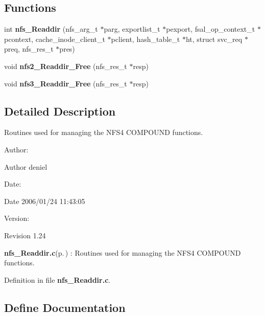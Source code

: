 \subsection*{Functions}
\begin{CompactItemize}
\item 
int {\bf nfs\_\-Readdir} (nfs\_\-arg\_\-t $\ast$parg, exportlist\_\-t $\ast$pexport, fsal\_\-op\_\-context\_\-t $\ast$pcontext, cache\_\-inode\_\-client\_\-t $\ast$pclient, hash\_\-table\_\-t $\ast$ht, struct svc\_\-req $\ast$preq, nfs\_\-res\_\-t $\ast$pres)
\item 
void {\bf nfs2\_\-Readdir\_\-Free} (nfs\_\-res\_\-t $\ast$resp)
\item 
void {\bf nfs3\_\-Readdir\_\-Free} (nfs\_\-res\_\-t $\ast$resp)
\end{CompactItemize}


\subsection{Detailed Description}
Routines used for managing the NFS4 COMPOUND functions. 

\begin{Desc}
\item[Author:]\begin{Desc}
\item[Author]deniel \end{Desc}
\end{Desc}
\begin{Desc}
\item[Date:]\begin{Desc}
\item[Date]2006/01/24 11:43:05 \end{Desc}
\end{Desc}
\begin{Desc}
\item[Version:]\begin{Desc}
\item[Revision]1.24 \end{Desc}
\end{Desc}
{\bf nfs\_\-Readdir.c}{\rm (p.\,\pageref{nfs__Readdir_8c})} : Routines used for managing the NFS4 COMPOUND functions.

Definition in file {\bf nfs\_\-Readdir.c}.

\subsection{Define Documentation}
